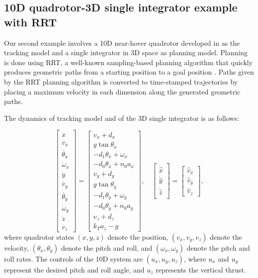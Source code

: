 \subsection{10D quadrotor-3D single integrator example with RRT\label{sec:resultsRRT}}

Our second example involves a 10D near-hover quadrotor developed in \cite{Bouffard12} as the tracking model and a single integrator in 3D space as planning model.
Planning is done using RRT, a well-known sampling-based planning algorithm that quickly produces geometric paths from a starting position to a goal position \cite{Kuffner2000,Kavraki1996}.
Paths given by the RRT planning algorithm is converted to time-stamped trajectories by placing a maximum velocity in each dimension along the generated geometric paths.

The dynamics of tracking model and of the 3D single integrator is as follows:

\begin{equation}
\label{eq:Quad10D_dyn}
\begin{bmatrix}
\dot{x}\\
\dot{v_x}\\
\dot{\theta_x}\\
\dot\omega_x\\
\dot{y}\\
\dot{v_y}\\
\dot{\theta_y}\\
\dot\omega_y\\
\dot{z}\\
\dot{v_z}
\end{bmatrix}
=
\begin{bmatrix}
v_x + d_x\\
g \tan \theta_x\\
-d_1 \theta_x + \omega_x\\
-d_0 \theta_x + n_0 a_x\\
v_y + d_y\\
g \tan \theta_y\\
-d_1 \theta_y + \omega_y\\
-d_0 \theta_y + n_0 a_y\\
v_z + d_z\\
k_T a_z - g
\end{bmatrix}, \quad
\begin{bmatrix}
\dot{\hat x}\\
\dot{\hat y}\\
\dot{\hat z}\\
\end{bmatrix} =
\begin{bmatrix}
\hat v_x \\
\hat v_y \\
\hat v_z
\end{bmatrix},
\end{equation}
\noindent where quadrotor states $(x, y, z)$ denote the position, $(v_x, v_y, v_z)$ denote the velocity, $(\theta_x, \theta_y)$ denote the pitch and roll, and $(\omega_x, \omega_y)$ denote the pitch and roll rates. 
The controls of the 10D system are $(u_x, u_y, u_z)$, where $u_x$ and $u_y$ represent the desired pitch and roll angle, and $u_z$ represents the vertical thrust.

